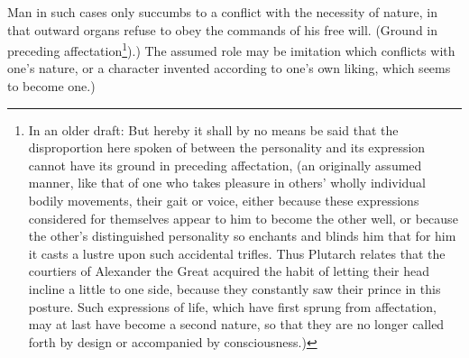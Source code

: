 \documentclass[12pt]{article}
\newcommand{\opage}[1]{\marginnote{\footnotesize\textit{[#1]}}}
\begin{document}
Man in such cases only succumbs to a conflict with the necessity of nature, in that outward organs refuse to obey the commands of his free will. (Ground in preceding affectation\footnote{In an older draft: But hereby it shall by no means be said that the disproportion here spoken of between the personality and its expression cannot have its ground in preceding affectation, (an originally assumed manner, like that of one who takes pleasure in others' wholly individual bodily movements, their gait or voice, either because these expressions considered for themselves appear to him to become the other well, or because the other's distinguished personality so enchants and blinds him that for him it casts a lustre upon such accidental trifles. Thus Plutarch relates that the courtiers of Alexander the Great acquired the habit of letting their head incline a little to one side, because they constantly saw their prince in this posture. Such expressions of life, which have first sprung from affectation, may at last have become a second nature, so that they are no longer called forth by design or accompanied by consciousness.)}).) The assumed role may be imitation which \opage{169}conflicts with one's nature, or a character invented according to one's own liking, which seems to become one.)
\end{document}
